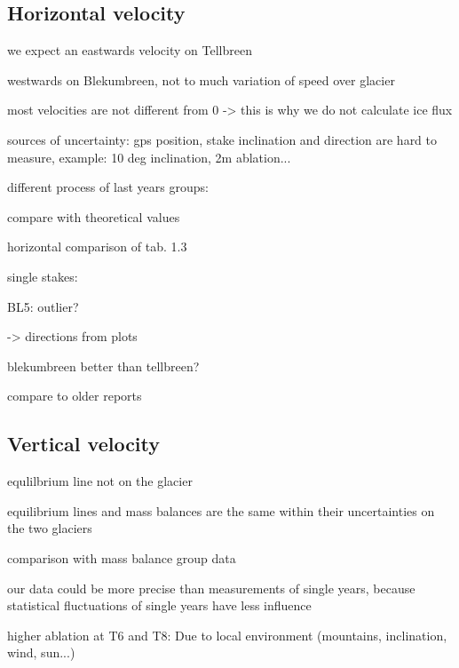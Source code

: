 
\subsection{Horizontal velocity}

we expect an eastwards velocity on Tellbreen

westwards on Blekumbreen, not to much variation of speed over glacier

most velocities are not different from 0
-> this is why we do not calculate ice flux


sources of uncertainty:
gps position,
stake inclination and direction are hard to measure,
example: 10 deg inclination, 2m ablation...

different process of last years groups:


compare with theoretical values

horizontal comparison of tab. 1.3


single stakes:

BL5:
outlier?


-> directions from plots


blekumbreen better than tellbreen?

compare to older reports

\subsection{Vertical velocity}


equlilbrium line not on the glacier

equilibrium lines and mass balances are the same within their uncertainties on the two glaciers


comparison with mass balance group data

our data could be more precise than measurements of single years, because statistical fluctuations of single years have less influence


higher ablation at T6 and T8: Due to local environment (mountains, inclination, wind, sun...)





